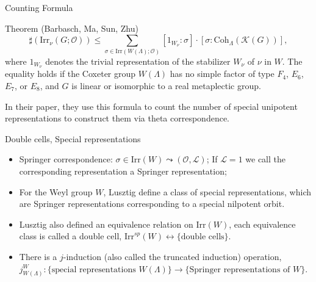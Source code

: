 \documentclass[fleqn,xcolor=dvipsnames]{beamer}
\newcommand{\CK}{{\mathcal {K}}}
\newcommand{\CL}{{\mathcal {L}}}
\newcommand{\CO}{{\mathcal {O}}}
\newcommand{\Irr}{{\mathrm{Irr}}}
\begin{document}
\begin{frame}{Counting Formula}
\begin{block}{Theorem (Barbasch, Ma, Sun, Zhu)}
  \begin{equation*}
        \sharp(\Irr_{\nu}(G;\CO)) \leq \sum\limits_{\sigma \in \Irr(W(\Lambda);\CO)} [1_{W_\nu}:\sigma] \cdot [\sigma:\mathrm{Coh}_{\Lambda}(\CK(G))],
    \end{equation*}
    where $1_{W_\nu}$ denotes the trivial representation of the stabilizer $W_\nu$ of $\nu$ in $W$. The \alert{equality holds} if the Coxeter group $W(\Lambda)$ has no simple factor of type $F_4$, $E_6$, $E_7$, or $E_8$, and $G$ is linear or isomorphic to a real metaplectic group.
\end{block}

 In their paper, they use this formula to count the number of special unipotent representations to construct them via theta correspondence.

\end{frame}




\begin{frame}{Double cells, Special representations}
  
\begin{itemize}
  \item Springer correspondence: $\sigma \in \Irr(W) \leadsto (\CO,\CL)$; If $\CL =1$ we call the corresponding representation a Springer representation;
  \item For the Weyl group $W$, Lusztig define a class of \alert{special representations}, which are Springer representations corresponding to a \alert{special nilpotent orbit}.
  \item Lusztig also defined an equivalence relation on $\Irr(W)$, each equivalence class is called a \alert{double cell}, $\Irr^{sp}(W) \leftrightarrow \{ \textrm{double cells} \}$.
  \item There is a \alert{$j$-induction} (also called the truncated induction) operation, $j_{W(\Lambda)}^{W}: \{ \textrm{special representations $W(\Lambda)$}\} \to \{\textrm{Springer representations of $W$} \}$.
\end{itemize}

\end{frame}
\end{document}
